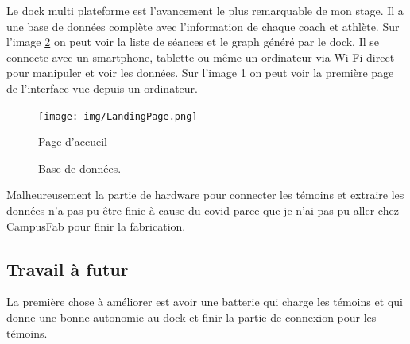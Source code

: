 \documentclass[12pt]{article}
\begin{document}
\begin{par}
	Le dock multi plateforme est 	l'avancement le plus remarquable de mon stage. Il 	a une base de données complète avec l'information 	de chaque coach et athlète. Sur l'image \ref{img:gui_all} 	on peut voir la liste de séances et le graph généré 	par le dock.
	Il se connecte avec 	un smartphone, tablette ou même un ordinateur via 	Wi-Fi direct pour manipuler et voir les données.	Sur l'image \ref{img:gui:landing-page} on peut voir 	la première page de l'interface vue depuis un 	ordinateur.
\end{par}

\begin{figure}[!htb]
	\centering
	\texttt{[image: img/LandingPage.png]}
	\caption{Page d'accueil}
	\label{img:gui:landing-page}
\end{figure}

\begin{figure}[!htb]
	\centering
	\caption{Base de données.}
	\label{img:gui_all}
\end{figure}

\begin{par}
	Malheureusement la partie de hardware pour connecter 	les témoins et extraire les données n'a pas pu être 	finie à cause du covid parce que je n'ai pas pu aller 	chez CampusFab pour finir la fabrication.
\end{par}

\subsection*{Travail à futur}
\begin{par}
	La première chose à améliorer est avoir une batterie qui charge 	les témoins et qui donne une bonne autonomie au dock et finir la 	partie de connexion pour les témoins.
\end{par}
\end{document}
